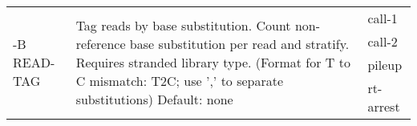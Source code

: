 {\small
\begin{tabular}{@{}p{}p{}l@{}}
\multirow{4}{=}{-B READ-TAG} & \multirow{4}{=}{Tag reads by base substitution.
Count non-reference base substitution per read and stratify.
Requires stranded library type.
(Format for T to C mismatch: T2C; use ',' to separate substitutions)
Default: none} & call-1 \\
 &  & call-2 \\
 &  & pileup \\
 &  & rt-arrest \\
\end{tabular}\\
}
